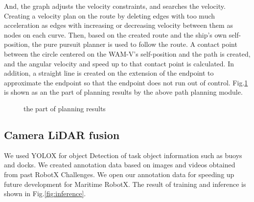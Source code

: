 \documentclass[lettersize,journal]{IEEEtran}
\begin{document}
And, the graph adjusts the velocity constraints, and searches the velocity.
Creating a velocity plan on the route by deleting edges with too much acceleration as edges with increasing or decreasing velocity between them as nodes on each curve.
Then, based on the created route and the ship's own self-position, the pure pursuit planner is used to follow the route.
A contact point between the circle centered on the WAM-V's self-position and the path is created, and the angular velocity and speed up to that contact point is calculated.
In addition, a straight line is created on the extension of the endpoint to approximate the endpoint so that the endpoint does not run out of control.
Fig.\ref{fig:the part of planning results} is shown as an the part of planning results by the above path planning module.
\begin{figure}[htbp]
  \begin{center}
  \end{center}
  \caption{the part of planning results}
  \label{fig:the part of planning results}
\end{figure}

\subsection{Camera LiDAR fusion}
We used  YOLOX\cite{YOLOX} for object Detection of task object information such as buoys and docks.
We created annotation data based on images and videos obtained from past RobotX Challenges.
We open our annotation data for speeding up future development for Maritime RobotX. \cite{dataset_annotations}
The result of training and inference is shown in Fig.\ref{fig:inference}.
\end{document}
